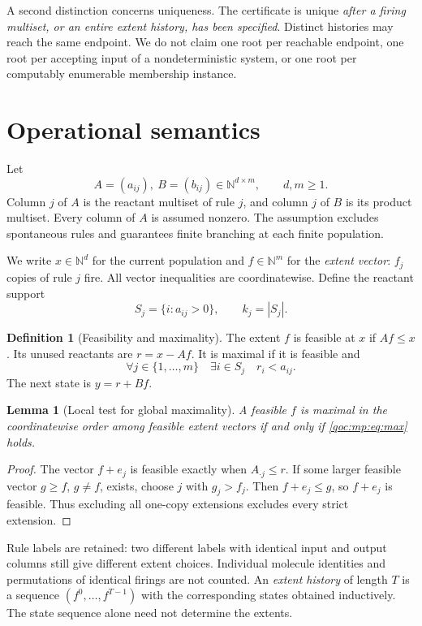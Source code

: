 \documentclass[11pt,letterpaper]{article}
\newtheorem{lemma}[theorem]{Lemma}
\theoremstyle{definition}
\newtheorem{definition}[theorem]{Definition}
\theoremstyle{remark}
\newcommand{\N}{\mathbb N}
\begin{document}
A second distinction concerns uniqueness. The certificate is unique
\emph{after a firing multiset, or an entire extent history, has been
specified}. Distinct histories may reach the same endpoint. We do not
claim one root per reachable endpoint, one root per accepting input of a
nondeterministic system, or one root per computably enumerable membership
instance.

\section{Operational semantics}\label{qoc:mp:sec:semantics}
Let
\[
 A=(a_{ij}),\ B=(b_{ij})\in\N^{d\times m},\qquad d,m\ge1.
\]
Column $j$ of $A$ is the reactant multiset of rule $j$, and column $j$ of
$B$ is its product multiset. Every column of $A$ is assumed nonzero. The
assumption excludes spontaneous rules and guarantees finite branching at
each finite population.

We write $x\in\N^d$ for the current population and $f\in\N^m$ for the
\emph{extent vector}: $f_j$ copies of rule $j$ fire. All vector inequalities
are coordinatewise. Define the reactant support
\[
 S_j=\{i:a_{ij}>0\},\qquad k_j=|S_j|.
\]

\begin{definition}[Feasibility and maximality]\label{qoc:mp:def:max}
The extent $f$ is feasible at $x$ if $Af\le x$. Its unused reactants are
$r=x-Af$. It is maximal if it is feasible and
\begin{equation}\label{qoc:mp:eq:max}
 \forall j\in\{1,\ldots,m\}\quad
 \exists i\in S_j\quad r_i<a_{ij}.
\end{equation}
The next state is $y=r+Bf$.
\end{definition}

\begin{lemma}[Local test for global maximality]\label{qoc:mp:lem:maxlocal}
A feasible $f$ is maximal in the coordinatewise order among feasible
extent vectors if and only if \eqref{qoc:mp:eq:max} holds.
\end{lemma}
\begin{proof}
The vector $f+e_j$ is feasible exactly when $A_{\cdot j}\le r$. If some
larger feasible vector $g\ge f$, $g\ne f$, exists, choose $j$ with $g_j>f_j$.
Then $f+e_j\le g$, so $f+e_j$ is feasible. Thus excluding all one-copy
extensions excludes every strict extension.
\end{proof}

Rule labels are retained: two different labels with identical input and
output columns still give different extent choices. Individual molecule
identities and permutations of identical firings are not counted. An
\emph{extent history} of length $T$ is a sequence
$(f^0,\ldots,f^{T-1})$ with the corresponding states obtained inductively.
The state sequence alone need not determine the extents.
\end{document}
